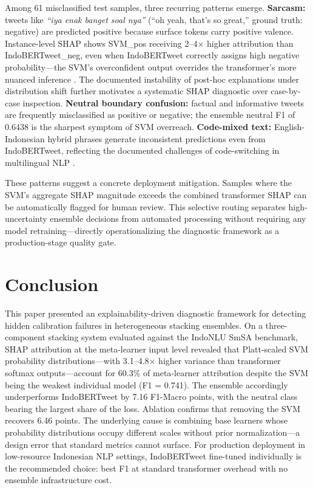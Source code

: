\documentclass[conference]{IEEEtran}
\begin{document}
Among 61 misclassified test samples, three recurring patterns emerge. \textbf{Sarcasm:} tweets like \textit{``iya enak banget soal nya''} (``oh yeah, that's so great,'' ground truth: negative) are predicted positive because surface tokens carry positive valence. Instance-level SHAP shows SVM\_pos receiving 2--4$\times$ higher attribution than IndoBERTweet\_neg, even when IndoBERTweet correctly assigns high negative probability---the SVM's overconfident output overrides the transformer's more nuanced inference \cite{b21}. The documented instability of post-hoc explanations under distribution shift \cite{b28} further motivates a systematic SHAP diagnostic over case-by-case inspection. \textbf{Neutral boundary confusion:} factual and informative tweets are frequently misclassified as positive or negative; the ensemble neutral F1 of 0.6438 is the sharpest symptom of SVM overreach. \textbf{Code-mixed text:} English-Indonesian hybrid phrases generate inconsistent predictions even from IndoBERTweet, reflecting the documented challenges of code-switching in multilingual NLP \cite{b26}.

These patterns suggest a concrete deployment mitigation. Samples where the SVM's aggregate SHAP magnitude exceeds the combined transformer SHAP can be automatically flagged for human review. This selective routing separates high-uncertainty ensemble decisions from automated processing without requiring any model retraining---directly operationalizing the diagnostic framework as a production-stage quality gate.

\section{Conclusion}

This paper presented an explainability-driven diagnostic framework for detecting hidden calibration failures in heterogeneous stacking ensembles. On a three-component stacking system evaluated against the IndoNLU SmSA benchmark, SHAP attribution at the meta-learner input level revealed that Platt-scaled SVM probability distributions---with 3.1--4.8$\times$ higher variance than transformer softmax outputs---account for 60.3\% of meta-learner attribution despite the SVM being the weakest individual model (F1 = 0.741). The ensemble accordingly underperforms IndoBERTweet by 7.16 F1-Macro points, with the neutral class bearing the largest share of the loss. Ablation confirms that removing the SVM recovers 6.46 points. The underlying cause is combining base learners whose probability distributions occupy different scales without prior normalization---a design error that standard metrics cannot surface. For production deployment in low-resource Indonesian NLP settings, IndoBERTweet fine-tuned individually is the recommended choice: best F1 at standard transformer overhead with no ensemble infrastructure cost.
\end{document}
